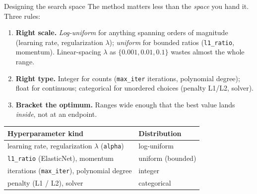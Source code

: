 \documentclass[aspectratio=169]{beamer}
\begin{document}
\begin{frame}{Designing the search space}
  The method matters less than the \emph{space} you hand it. Three rules:
  \vfill
  \begin{enumerate}\small
    \item \textbf{Right scale.} \emph{Log-uniform} for anything spanning orders of magnitude (learning rate, regularization $\lambda$); \emph{uniform} for bounded ratios (\texttt{l1\_ratio}, momentum). Linear-spacing $\lambda$ as $\{0.001, 0.01, 0.1\}$ wastes almost the whole range.
    \item \textbf{Right type.} Integer for counts (\texttt{max\_iter} iterations, polynomial degree); float for continuous; categorical for unordered choices (penalty L1/L2, solver).
    \item \textbf{Bracket the optimum.} Ranges wide enough that the best value lands \emph{inside}, not at an endpoint.
  \end{enumerate}
  \vfill
  \begin{center}\scriptsize
  \begin{tabular}{ll}
    Hyperparameter kind & Distribution \\
    \hline
    learning rate, regularization $\lambda$ (\texttt{alpha}) & log-uniform \\
    \texttt{l1\_ratio} (ElasticNet), momentum & uniform (bounded) \\
    iterations (\texttt{max\_iter}), polynomial degree & integer \\
    penalty (L1 / L2), solver & categorical \\
  \end{tabular}
  \end{center}
  \vfill
\end{frame}
\end{document}
